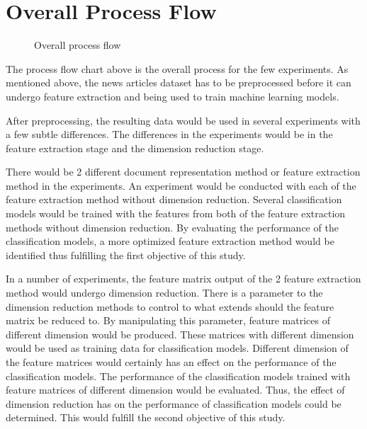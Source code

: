 \section{Overall Process Flow}
\begin{figure} [ht]
\centering
{}
\caption{Overall process flow}
\label{fig: overallFlow}
\end{figure}

The process flow chart above is the overall process for the few experiments. As mentioned above, the news articles dataset has to be preprocessed before it can undergo feature extraction and being used to train machine learning models.

After preprocessing, the resulting data would be used in several experiments with a few subtle differences.
The differences in the experiments would be in the feature extraction stage and the dimension reduction stage. 

There would be 2 different document representation method or feature extraction method in the experiments. An experiment would be conducted with each of the feature extraction method without dimension reduction. Several classification models would be trained with the features from both of the feature extraction methods without dimension reduction. By evaluating the performance of the classification models, a more optimized feature extraction method would be identified thus fulfilling the first objective of this study.

In a number of experiments, the feature matrix output of the 2 feature extraction method would undergo dimension reduction. There is a parameter to the dimension reduction methods to control to what extends should the feature matrix be reduced to. By manipulating this parameter, feature matrices of different dimension would be produced. These matrices with different dimension would be used as training data for classification models. Different dimension of the feature matrices would certainly has an effect on the performance of the classification models. The performance of the classification models trained with feature matrices of different dimension would be evaluated. Thus, the effect of dimension reduction has on the performance of classification models could be determined. This would fulfill the second objective of this study.

